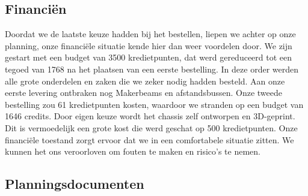 \documentclass[a4paper,kulak]{kulakarticle}
\begin{document}
\subsection{Financiën}

Doordat we de laatste keuze hadden bij het bestellen, liepen we achter op onze planning, onze financiële situatie kende hier dan weer voordelen door. We zijn gestart met een budget van 3500 kredietpunten, dat werd gereduceerd tot een tegoed van 1768 na het plaatsen van een eerste bestelling. In deze  order \cite{woordenlijst} werden alle grote onderdelen en zaken die we zeker nodig hadden besteld.  Aan onze eerste levering ontbraken nog Makerbeams en afstandsbussen. Onze tweede bestelling zou 61 kredietpunten kosten, waardoor we stranden op een budget van 1646 credits. Door eigen keuze wordt het chassis zelf ontworpen en 3D-geprint. Dit is vermoedelijk een grote kost die werd geschat op 500 kredietpunten. Onze financiële toestand zorgt ervoor dat we in een comfortabele situatie zitten. We kunnen het ons veroorloven om fouten te maken en risico's te nemen. 



\begin{appendices}
	\section*{Planningsdocumenten} %
	\renewcommand\refname{} %
	\vspace{-2\bigskipamount} %

	







\end{appendices}
\end{document}
